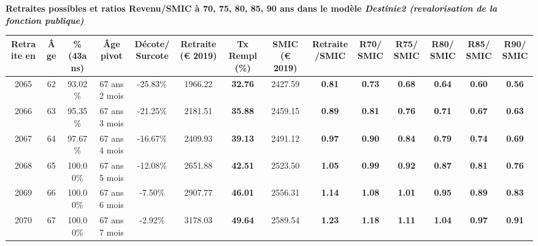  \vspace{0.1cm} 
{\bf \noindent Retraites possibles et ratios Revenu/SMIC à 70, 75, 80, 85, 90 ans dans le modèle \emph{Destinie2 (revalorisation de la fonction publique)}}  
 
\begin{adjustbox}{max width=\textwidth} 
\begin{tabular}[htb]{|c|c||c|c|c||c|c||c|c||c|c|c|c|c|} 
\hline 
 Retraite en &  Âge &  \%(43ans) &  Âge pivot &  Décote/Surcote &  Retraite (\euro{} 2019) &  Tx Rempl(\%) &  SMIC (\euro{} 2019) &  Retraite/SMIC &  R70/SMIC &  R75/SMIC &  R80/SMIC &  R85/SMIC &  R90/SMIC \\ 
\hline \hline 
 2065 &  62 &  93.02\% &  67 ans 2 mois &  -25.83\% &  1966.22 &  {\bf 32.76} &  2427.59 &  {\bf {\color{red} 0.81}} &  {\bf {\color{red} 0.73}} &  {\bf {\color{red} 0.68}} &  {\bf {\color{red} 0.64}} &  {\bf {\color{red} 0.60}} &  {\bf {\color{red} 0.56}} \\ 
\hline 
 2066 &  63 &  95.35\% &  67 ans 3 mois &  -21.25\% &  2181.51 &  {\bf 35.88} &  2459.15 &  {\bf {\color{red} 0.89}} &  {\bf {\color{red} 0.81}} &  {\bf {\color{red} 0.76}} &  {\bf {\color{red} 0.71}} &  {\bf {\color{red} 0.67}} &  {\bf {\color{red} 0.63}} \\ 
\hline 
 2067 &  64 &  97.67\% &  67 ans 4 mois &  -16.67\% &  2409.93 &  {\bf 39.13} &  2491.12 &  {\bf {\color{red} 0.97}} &  {\bf {\color{red} 0.90}} &  {\bf {\color{red} 0.84}} &  {\bf {\color{red} 0.79}} &  {\bf {\color{red} 0.74}} &  {\bf {\color{red} 0.69}} \\ 
\hline 
 2068 &  65 &  100.00\% &  67 ans 5 mois &  -12.08\% &  2651.88 &  {\bf 42.51} &  2523.50 &  {\bf 1.05} &  {\bf {\color{red} 0.99}} &  {\bf {\color{red} 0.92}} &  {\bf {\color{red} 0.87}} &  {\bf {\color{red} 0.81}} &  {\bf {\color{red} 0.76}} \\ 
\hline 
 2069 &  66 &  100.00\% &  67 ans 6 mois &  -7.50\% &  2907.77 &  {\bf 46.01} &  2556.31 &  {\bf 1.14} &  {\bf 1.08} &  {\bf 1.01} &  {\bf {\color{red} 0.95}} &  {\bf {\color{red} 0.89}} &  {\bf {\color{red} 0.83}} \\ 
\hline 
 2070 &  67 &  100.00\% &  67 ans 7 mois &  -2.92\% &  3178.03 &  {\bf 49.64} &  2589.54 &  {\bf 1.23} &  {\bf 1.18} &  {\bf 1.11} &  {\bf 1.04} &  {\bf {\color{red} 0.97}} &  {\bf {\color{red} 0.91}} \\ 
\hline 
\hline 
\end{tabular} 
\end{adjustbox} 
 
